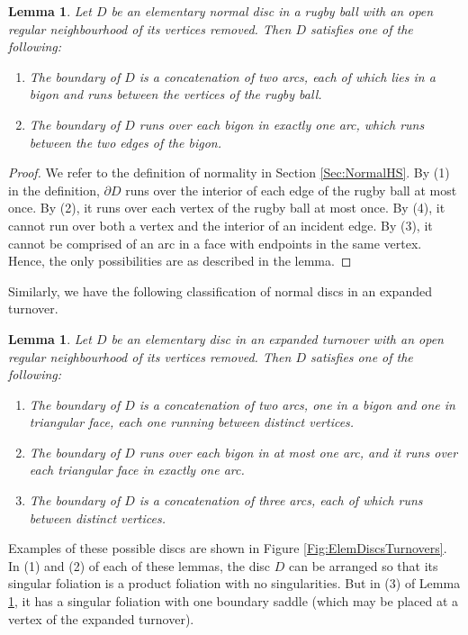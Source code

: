 \documentclass[oneside]{amsart}
\numberwithin{equation}{section}
\theoremstyle{plain}
\newtheorem{lemma}[equation]{Lemma}
\theoremstyle{definition}
\begin{document}
\begin{lemma}
\label{Lem:DiscsRugby}
Let $D$ be an elementary normal disc in a rugby ball with an open regular neighbourhood of its vertices
removed. Then $D$ satisfies one of the following:
\begin{enumerate}
\item The boundary of $D$ is a concatenation of two arcs, each of which lies in a bigon and runs
between the vertices of the rugby ball.
\item The boundary of $D$ runs over each bigon in exactly one arc, which runs between the
two edges of the bigon.
\end{enumerate}
\end{lemma}

\begin{proof}
We refer to the definition of normality in Section \ref{Sec:NormalHS}.
By (1) in the definition, $\partial D$ runs over the interior of each edge of the rugby ball at most once. By (2), it runs over each vertex of the rugby ball at most once. By (4), it cannot run over both a vertex and the interior of an incident edge. By (3), it cannot be comprised of an arc in a face with endpoints in the same vertex. Hence, the only possibilities are as described in the lemma.
\end{proof}

Similarly, we have the following classification of normal discs in an expanded turnover.

\begin{lemma}
\label{Lem:DiscsTurnover}
Let $D$ be an elementary disc in an expanded turnover with an open regular neighbourhood of its vertices
removed. Then $D$ satisfies one of the following:
\begin{enumerate}
\item The boundary of $D$ is a concatenation of two arcs, one in a bigon and one in triangular face,
each one running between distinct vertices.
\item The boundary of $D$ runs over each bigon in at most one arc, and it runs over each triangular
face in exactly one arc.
\item The boundary of $D$ is a concatenation of three arcs, each of which runs
between distinct vertices.
\end{enumerate}
\end{lemma}

Examples of these possible discs are shown in Figure \ref{Fig:ElemDiscsTurnovers}. In (1) and (2) of each
of these lemmas, the disc $D$ can be arranged so that its singular foliation is a product foliation with
no singularities. But in (3) of Lemma \ref{Lem:DiscsTurnover},
it has a singular foliation with one boundary saddle (which may be placed at a vertex of the expanded turnover).
\end{document}
